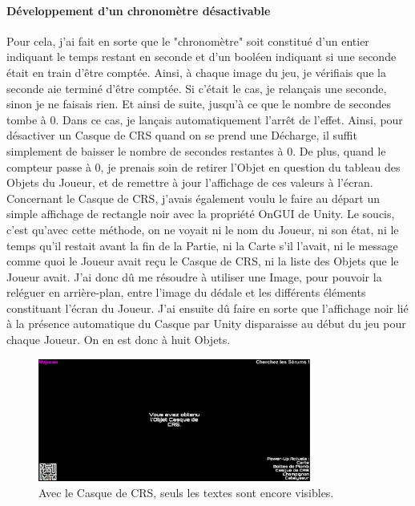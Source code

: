 \documentclass{article}
\begin{document}
\paragraph{Développement d'un chronomètre désactivable}
Pour cela, j'ai fait en sorte que le "chronomètre" soit constitué d'un entier indiquant le temps restant en seconde et d'un booléen indiquant si une seconde était en train d'être comptée. Ainsi, à chaque image du jeu, je vérifiais que la seconde aie terminé d'être comptée. Si c'était le cas, je relançais une seconde, sinon je ne faisais rien. Et ainsi de suite, jusqu'à ce que le nombre de secondes tombe à 0. Dans ce cas, je lançais automatiquement l'arrêt de l'effet. Ainsi, pour désactiver un Casque de CRS quand on se prend une Décharge, il suffit simplement de baisser le nombre de secondes restantes à 0. De plus, quand le compteur passe à 0, je prenais soin de retirer l'Objet en question du tableau des Objets du Joueur, et de remettre à jour l'affichage de ces valeurs à l'écran. Concernant le Casque de CRS, j'avais également voulu le faire au départ un simple affichage de rectangle noir avec la propriété OnGUI de Unity. Le soucis, c'est qu'avec cette méthode, on ne voyait ni le nom du Joueur, ni son état, ni le temps qu'il restait avant la fin de la Partie, ni la Carte s'il l'avait, ni le message comme quoi le Joueur avait reçu le Casque de CRS, ni la liste des Objets que le Joueur avait. J'ai donc dû me résoudre à utiliser une Image, pour pouvoir la reléguer en arrière-plan, entre l'image du dédale et les différents éléments constituant l'écran du Joueur. J'ai ensuite dû faire en sorte que l'affichage noir lié à la présence automatique du Casque par Unity disparaisse au début du jeu pour chaque Joueur. On en est donc à huit Objets.

\begin{figure}[H]
    \centering
    \includegraphics[width=0.8\textwidth]{Casque.png}
    \caption{Avec le Casque de CRS, seuls les textes sont encore visibles.}
    \label{Avec le Casque de CRS, seuls les textes sont encore visibles.}
\end{figure}
\end{document}
